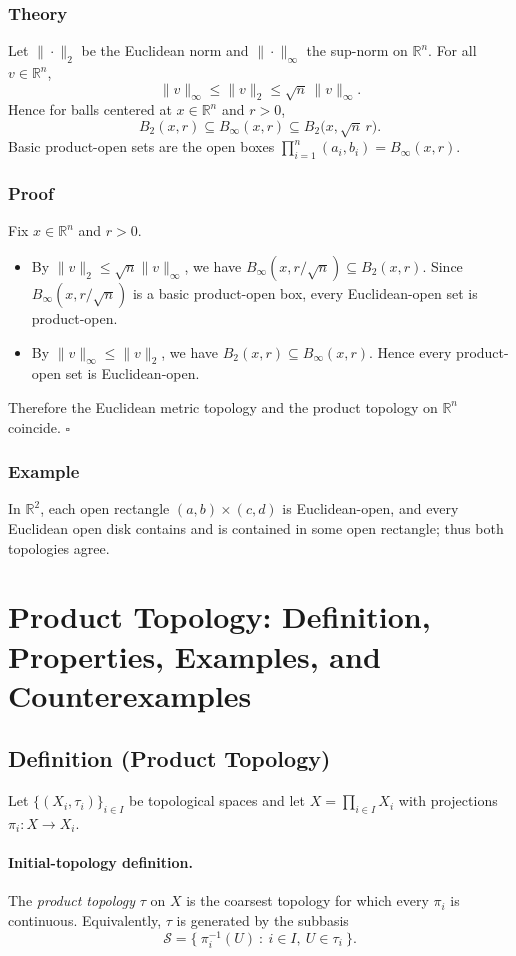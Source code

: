 \documentclass[12pt,a4paper]{article}
\newcommand{\qed}{\hfill$\square$}
\theoremstyle{plain}
\theoremstyle{definition}
\theoremstyle{remark}
\theoremstyle{remark}
\begin{document}
\subsubsection*{Theory}
Let $\|\cdot\|_2$ be the Euclidean norm and $\|\cdot\|_\infty$ the sup-norm on $\mathbb{R}^n$. For all $v\in\mathbb{R}^n$,
\[
\|v\|_\infty \le \|v\|_2 \le \sqrt{n}\,\|v\|_\infty.
\]
Hence for balls centered at $x\in\mathbb{R}^n$ and $r>0$,
\[
B_2(x,r)\subseteq B_\infty(x,r)\subseteq B_2\!\bigl(x,\sqrt{n}\,r\bigr).
\]
Basic product-open sets are the open boxes $\prod_{i=1}^n (a_i,b_i)=B_\infty(x,r)$.

\subsubsection*{Proof}
Fix $x\in\mathbb{R}^n$ and $r>0$.
\begin{itemize}
	\item By $\|v\|_2\le \sqrt{n}\|v\|_\infty$, we have
	\(B_\infty(x,r/\sqrt{n})\subseteq B_2(x,r)\).
	Since $B_\infty(x,r/\sqrt{n})$ is a basic product-open box, every Euclidean-open set is product-open.
	\item By $\|v\|_\infty\le \|v\|_2$, we have
	\(B_2(x,r)\subseteq B_\infty(x,r)\).
	Hence every product-open set is Euclidean-open.
\end{itemize}
Therefore the Euclidean metric topology and the product topology on $\mathbb{R}^n$ coincide. \qed

\subsubsection*{Example}
In $\mathbb{R}^2$, each open rectangle $(a,b)\times(c,d)$ is Euclidean-open, and every Euclidean open disk contains and is contained in some open rectangle; thus both topologies agree.

\section*{Product Topology: Definition, Properties, Examples, and Counterexamples}

\subsection*{Definition (Product Topology)}
Let $\{(X_i,\tau_i)\}_{i\in I}$ be topological spaces and let $X=\prod_{i\in I} X_i$ with projections $\pi_i:X\to X_i$.

\paragraph{Initial-topology definition.}
The \emph{product topology} $\tau$ on $X$ is the coarsest topology for which every $\pi_i$ is continuous.
Equivalently, $\tau$ is generated by the subbasis
\[
\mathcal{S}=\{\ \pi_i^{-1}(U)\ :\ i\in I,\ U\in\tau_i\ \}.
\]
\end{document}
